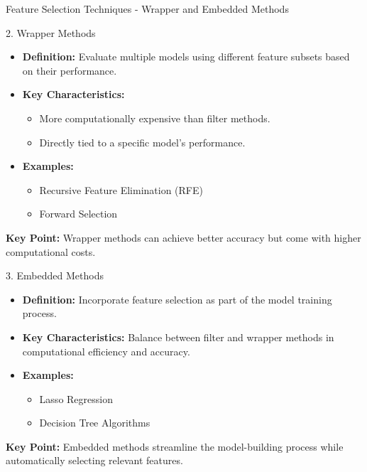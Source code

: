 \documentclass[aspectratio=169]{beamer}
\begin{document}
\begin{frame}[fragile]{Feature Selection Techniques - Wrapper and Embedded Methods}
    \begin{block}{2. Wrapper Methods}
        \begin{itemize}
            \item \textbf{Definition:} Evaluate multiple models using different feature subsets based on their performance.
            \item \textbf{Key Characteristics:}
            \begin{itemize}
                \item More computationally expensive than filter methods.
                \item Directly tied to a specific model's performance.
            \end{itemize}
            \item \textbf{Examples:}
            \begin{itemize}
                \item Recursive Feature Elimination (RFE)
                \item Forward Selection
            \end{itemize}
        \end{itemize}
        \textbf{Key Point:} Wrapper methods can achieve better accuracy but come with higher computational costs.
    \end{block}

    \begin{block}{3. Embedded Methods}
        \begin{itemize}
            \item \textbf{Definition:} Incorporate feature selection as part of the model training process.
            \item \textbf{Key Characteristics:} Balance between filter and wrapper methods in computational efficiency and accuracy.
            \item \textbf{Examples:}
            \begin{itemize}
                \item Lasso Regression
                \item Decision Tree Algorithms
            \end{itemize}
        \end{itemize}
        \textbf{Key Point:} Embedded methods streamline the model-building process while automatically selecting relevant features.
    \end{block}
\end{frame}
\end{document}
